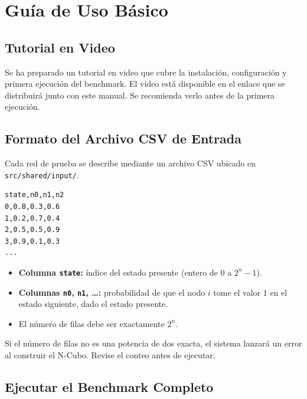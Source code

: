 \section{Guía de Uso Básico}
\label{sec:uso_basico}

\subsection{Tutorial en Video}

\begin{nota}
Se ha preparado un tutorial en video que cubre la instalación, configuración y primera ejecución del benchmark. El video está disponible en el enlace que se distribuirá junto con este manual. Se recomienda verlo antes de la primera ejecución.
\end{nota}

\subsection{Formato del Archivo CSV de Entrada}

Cada red de prueba se describe mediante un archivo CSV ubicado en \lstinline|src/shared/input/|.

\begin{lstlisting}[caption={Ejemplo de estructura CSV para una red de 3 nodos.}, label={lst:csv}]
state,n0,n1,n2
0,0.8,0.3,0.6
1,0.2,0.7,0.4
2,0.5,0.5,0.9
3,0.9,0.1,0.3
...
\end{lstlisting}

\begin{itemize}[itemsep=4pt]
    \item \textbf{Columna \texttt{state}:} índice del estado presente (entero de $0$ a $2^n - 1$).
    \item \textbf{Columnas \texttt{n0}, \texttt{n1}, \ldots:} probabilidad de que el nodo $i$ tome el valor $1$ en el estado siguiente, dado el estado presente.
    \item El número de filas debe ser exactamente $2^n$.
\end{itemize}

\begin{peligro}
Si el número de filas no es una potencia de dos exacta, el sistema lanzará un error al construir el N-Cubo. Revise el conteo antes de ejecutar.
\end{peligro}

\subsection{Ejecutar el Benchmark Completo}


